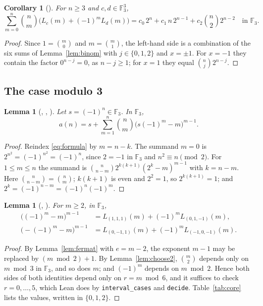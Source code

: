 \documentclass[11pt]{amsart}
\theoremstyle{plain}
\newtheorem{lemma}[theorem]{Lemma}
\newtheorem{corollary}[theorem]{Corollary}
\theoremstyle{definition}
\newcommand{\F}{\mathbb{F}}
\begin{document}
\begin{corollary}[]\label{cor:sumlin}
For $n\ge3$ and $c,d\in\F_3^3$,
\[
  \sum_{m=0}^{n}\binom nm\bigl(L_c(m)+(-1)^mL_d(m)\bigr)=c_0\,2^n+c_1\,n\,2^{n-1}+c_2\binom n2 2^{n-2}\quad\text{in }\F_3.
\]
\end{corollary}

\begin{proof}
Since $1=\binom m0$ and $m=\binom m1$, the left-hand side is a combination of the six sums of Lemma~\ref{lem:binom} with $j\in\{0,1,2\}$ and $x=\pm1$.
For $x=-1$ they contain the factor $0^{n-j}=0$, as $n-j\ge1$; for $x=1$ they equal $\binom nj2^{n-j}$.
\end{proof}

\subsection*{The case modulo 3}

\begin{lemma}[, , ]\label{lem:reindex}
Let $s=(-1)^n\in\F_3$. In $\F_3$,
\[
  a(n)=s+\sum_{m=1}^{n}\binom nm\bigl(s(-1)^m-m\bigr)^{m-1}.
\]
\end{lemma}

\begin{proof}
Reindex \eqref{eq:formula} by $m=n-k$.
The summand $m=0$ is $2^{n^2}=(-1)^{n^2}=(-1)^n$, since $2=-1$ in $\F_3$ and $n^2\equiv n\pmod2$.
For $1\le m\le n$ the summand is $\binom n{n-m}2^{k(k+1)}(2^k-m)^{m-1}$ with $k=n-m$.
Here $\binom n{n-m}=\binom nm$; $k(k+1)$ is even and $2^2=1$, so $2^{k(k+1)}=1$; and $2^k=(-1)^{n-m}=(-1)^n(-1)^m$.
\end{proof}

\begin{lemma}[, ]\label{lem:core}
For $m\ge2$, in $\F_3$,
\begin{align*}
  \bigl((-1)^m-m\bigr)^{m-1}&=L_{(1,1,1)}(m)+(-1)^m L_{(0,1,-1)}(m),\\
  \bigl(-(-1)^m-m\bigr)^{m-1}&=L_{(0,-1,1)}(m)+(-1)^m L_{(-1,0,-1)}(m).
\end{align*}
\end{lemma}

\begin{proof}
By Lemma~\ref{lem:fermat} with $e=m-2$, the exponent $m-1$ may be replaced by $(m\bmod2)+1$.
By Lemma~\ref{lem:choose2}, $\binom m2$ depends only on $m\bmod3$ in $\F_3$, and so does $m$; and $(-1)^m$ depends on $m\bmod2$.
Hence both sides of both identities depend only on $r=m\bmod6$, and it suffices to check $r=0,\dots,5$, which Lean does by \texttt{interval\_cases} and \texttt{decide}.
Table~\ref{tab:core} lists the values, written in $\{0,1,2\}$.
\end{proof}
\end{document}

